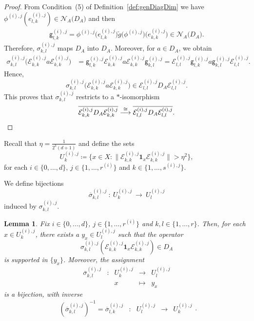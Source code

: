 \documentclass[a4paper]{amsart}
\numberwithin{equation}{section}
\newcommand{\Ecal}{\mathcal{E}}
\newcommand{\indF}{\mathbf{1}}
\newcommand{\rAr}{\longrightarrow}
\newcommand{\normbig}[1]{{\big\lVert #1 \big \rVert}}
\newcommand{\normalisers}[2]{{\mathcal{N}}_{#2}{\big({#1}\big)}}
\newcommand{\unMatImg}[3]{{\Ecal_{#3}^{(#1), #2}}}
\newcommand{\gUnMatImg}[3]{{ \mathsf{g}_{#3}^{(#1), #2}}}
\theoremstyle{plain}
\newtheorem{lem}[thm]{Lemma}
\theoremstyle{indented}
\numberwithin{equation}{section}
\theoremstyle{definition}
\theoremstyle{remark}
\theoremstyle{plain}
\theoremstyle{definition}
\begin{document}
\begin{proof}
     From Condition~(5) of Definition~\ref{def:genDiagDim} we have
     ${\phi^{(i),j}(e_{l,k}^{(i),j})\in \normalisers{D_A}{A}}$ and then
     \begin{align*}
        \gUnMatImg{i}{j}{l,k} = \phi^{(i),j}\big(e_{l,k}^{(i),j}\big) \widetilde{g}\big({\phi^{(i),j}}\big) \big(e_{k,k}^{(i),j}\big) \in \normalisers{D_A}{A}.
     \end{align*}
     Therefore,  $\sigma_{k,l}^{(i),j}$ maps $D_A$ into $D_A$. 
     Moreover, for $a \in D_A$, we obtain
     \begin{align*}
         \sigma_{k,l}^{(i),j}\big(  \unMatImg{i}{j}{k,k} a \unMatImg{i}{j}{k,k} \big) 
        & = \gUnMatImg{i}{j}{l,k} \unMatImg{i}{j}{k,k} a \unMatImg{i}{j}{k,k}  \gUnMatImg{i}{j}{k,l} =  \unMatImg{i}{j}{l,l} \gUnMatImg{i}{j}{l,k} a \gUnMatImg{i}{j}{k,l}   \unMatImg{i}{j}{l,l}.
     \end{align*}
     Hence,
     \[\sigma_{k,l}^{(i),j}\big( \unMatImg{i}{j}{k,k} a \unMatImg{i}{j}{k,k} \big) \in \unMatImg{i}{j}{l,l} D_A \unMatImg{i}{j}{l,l}.\]
    This proves that $\sigma_{k,l}^{(i),j}$ restricts to a ${\ast}$-isomorphism 
     \[ \overline{\unMatImg{i}{j}{k,k} D_A \unMatImg{i}{j}{k,k}} \overset{\cong}{\longrightarrow} \overline{\unMatImg{i}{j}{l,l} D_A \unMatImg{i}{j}{l,l}}. \qedhere \]
\end{proof}

 Recall that 
 ${\eta = \frac{1}{2^3 (d+1)}}$
 and define the sets
\begin{equation*}
        {U^{(i),j}_k} \coloneq \Big\{ x \in X  \colon  \normbig{
        \unMatImg{i}{j}{k,k}
         \indF_x \unMatImg{i}{j}{k,k} }> \eta^2 \Big\},
\end{equation*}
for each ${i \in \{ 0, \hdots, d\}}$, ${j\in \{ 1,\hdots,r^{(i)}\}}$ and ${k\in \{1,\hdots,s^{(i),j}\}}$.
    
We define bijections 
\[{{\overline{\sigma}_{k,l}^{(i),j}}~\colon~ {U^{(i),j}_k}~\rAr~U^{(i),j}_l }\]
induced by ${{\sigma}_{k,l}^{(i),j}}$.

\begin{lem} \label{lem:homeoDecomp}
     Fix ${i\in \{0,\hdots,d\}}$, ${j\in \{ 1,\hdots,r^{(i)}\}}$
     and ${k,l\in \{1,\hdots,r\}}$.
        Then, for each ${x \in{U^{(i),j}_k}}$, there exists a ${y_x \in{U^{(i),j}_l}}$ such that 
     the operator 
     \begin{equation*}
         \sigma_{k,l}^{(i),j}(\unMatImg{i}{j}{k,k} \indF_x \unMatImg{i}{j}{k,k}) \in D_A 
     \end{equation*}
     is supported in $\{y_x\}$.
    Moreover, the assignment 
    \[
     \begin{array}{ccccl}
      {\overline{\sigma}_{k,l}^{(i),j}} & \colon & {U^{(i),j}_k}  & \rAr  &  U^{(i),j}_l\\
      & & x & \longmapsto & y_x 
     \end{array}
     \] 
    is a bijection, with 
    inverse 
    \[
     \begin{array}{ccccl}
      \left({\overline{\sigma}_{k,l}^{(i),j}} \right)^{-1}= {\overline{\sigma}_{l,k}^{(i),j}} & \colon & {U^{(i),j}_l}  & \rAr  &  U^{(i),j}_k
     \end{array}.
     \] 
\end{lem}
\end{document}
